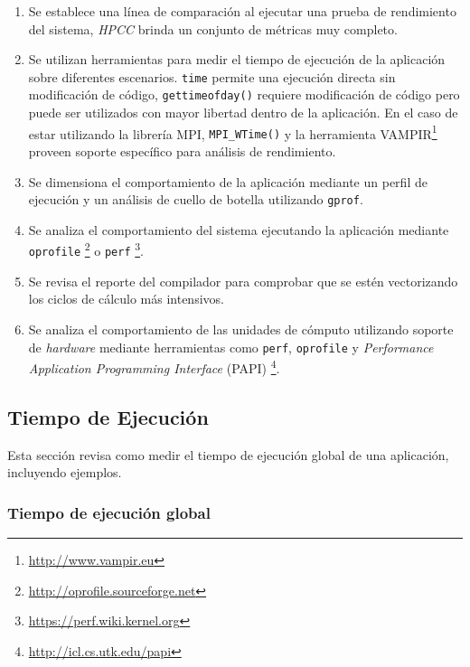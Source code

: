 \documentclass[a4paper]{report}
\begin{document}
\begin{enumerate}

\item Se establece una línea de comparación al ejecutar una prueba de rendimiento del sistema, {\it HPCC} brinda un conjunto de métricas muy completo. 

\item Se utilizan herramientas para medir el tiempo de ejecución de la aplicación sobre diferentes escenarios. {\tt time} permite una ejecución directa sin modificación de código, {\tt gettimeofday()} requiere modificación de código pero puede ser utilizados con mayor libertad dentro de la aplicación.  
En el caso de estar utilizando la librería MPI, {\tt MPI\_WTime()} y la herramienta VAMPIR\footnote{\href{http://www.vampir.eu}{http://www.vampir.eu}} proveen soporte específico para análisis de rendimiento.

\item Se dimensiona el comportamiento de la aplicación mediante un perfil de ejecución y un análisis de cuello de botella utilizando {\tt gprof}. 

\item Se analiza el comportamiento del sistema ejecutando la aplicación mediante {\tt oprofile} \footnote{\href{http://oprofile.sourceforge.net}{http://oprofile.sourceforge.net}} o {\tt perf} \footnote{\href{https://perf.wiki.kernel.org}{https://perf.wiki.kernel.org}}. 

\item Se revisa el reporte del compilador para comprobar que se estén vectorizando los ciclos de cálculo más intensivos.

\item Se analiza el comportamiento de las unidades de cómputo utilizando soporte de {\it hardware} mediante herramientas como {\tt perf}, {\tt oprofile} y {\it Performance Application Programming Interface} (PAPI) \footnote{\href{http://icl.cs.utk.edu/papi}{http://icl.cs.utk.edu/papi}}.

\end{enumerate}

\subsection{Tiempo de Ejecución}

Esta sección revisa como medir el tiempo de ejecución global de una aplicación, incluyendo ejemplos.

\subsubsection{Tiempo de ejecución global}
\end{document}
